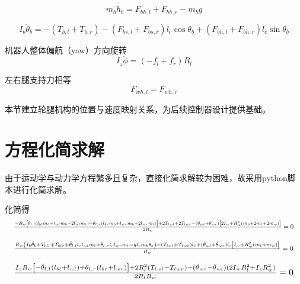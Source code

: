 \begin{equation}
m_b \ddot{h}_b = F_{bh,l} + F_{bh,r} - m_b g 
\end{equation}

\begin{equation}
I_b \ddot{\theta}_b = -(T_{b,l} + T_{b,r}) - (F_{bs,l} + F_{bs,r}) l_c \cos\theta_b + (F_{bh,l} + F_{bh,r}) l_c \sin\theta_b
\end{equation}

机器人整体偏航（yaw）方向旋转
\begin{equation}
I_z \ddot{\phi} = (-f_l + f_r) R_l 
\end{equation}

左右腿支持力相等
\begin{equation}
F_{wh,l} = F_{wh,r} 
\end{equation}

本节建立轮腿机构的位置与速度映射关系，为后续控制器设计提供基础。

\section{方程化简求解}
由于运动学与动力学方程繁多且复杂，直接化简求解较为困难，故采用python脚本进行化简求解。

化简得
\begin{equation}
\resizebox{0.98\linewidth}{!}{$
\frac{-R_w \left[ \ddot{\theta}_{l,l} (l_{bl} m_b + l_{wl} m_b + 2l_{wl} m_l) + \ddot{\theta}_{l,r} (l_{br} m_b + l_{wr} m_b + 2l_{wr} m_l) \right] + 2T_{lwl} + 2T_{lwr} - (\ddot{\theta}_{wl} + \ddot{\theta}_{wr}) \left[ 2I_w + R_w^2 (m_b + 2m_l + 2m_w) \right]}{2R_w} = 0
$}
\label{eq:x_y_move}
\end{equation}

\begin{equation}
\resizebox{0.98\linewidth}{!}{$
\frac{R_w \left( I_b \ddot{\theta}_b + T_{bll} + T_{blr} + \ddot{\theta}_{l,l} l_c l_{wl} m_l + \ddot{\theta}_{l,r} l_c l_{wr} m_l - g l_c m_b \theta_b \right) - (T_{lwl} + T_{lwr}) l_c + (\ddot{\theta}_{wl} + \ddot{\theta}_{wr}) l_c \left[ I_w + R_w^2 (m_l + m_w) \right]}{R_w} = 0
$}
\label{eq:pitch_move}
\end{equation}

\begin{equation}
\resizebox{0.98\linewidth}{!}{$
\frac{I_z R_w \left[ -\ddot{\theta}_{l,l}(l_{bl} + l_{wl}) + \ddot{\theta}_{l,r}(l_{br} + l_{wr}) \right] + 2R_l^2 (T_{lwl} - T_{lwr}) + (\ddot{\theta}_{wr} - \ddot{\theta}_{wl}) (2I_w R_l^2 + I_z R_w^2)}{2R_l R_w} = 0
$}
\label{eq:yaw_move}
\end{equation}

